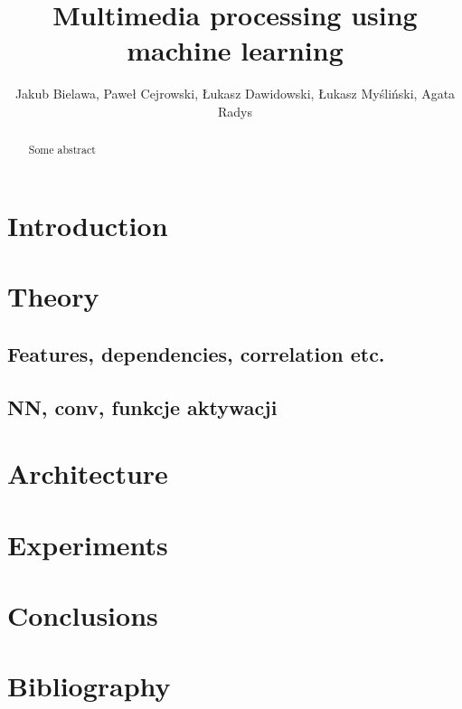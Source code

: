 \documentclass[journal, a4paper]{IEEEtran}
\begin{document}
	\title{Multimedia processing using machine learning}
	\author{Jakub Bielawa, Paweł Cejrowski, Łukasz Dawidowski, Łukasz Myśliński, Agata Radys}
	\maketitle

\begin{abstract}
Some abstract
\end{abstract}

\section{Introduction}
\section{Theory}
\subsection{Features, dependencies, correlation etc.}
\subsection{NN, conv, funkcje aktywacji}
\section{Architecture}
\section{Experiments}
\section{Conclusions}
\section{Bibliography}
\end{document}
